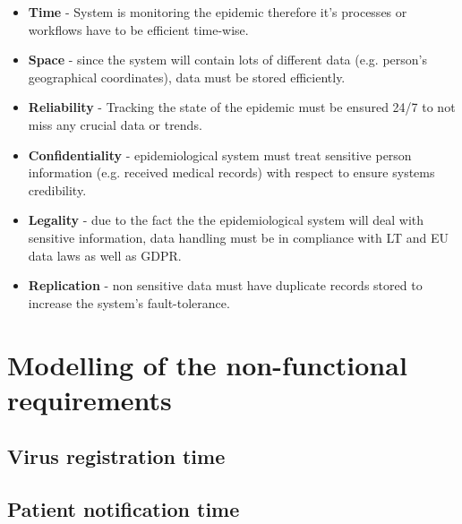 \documentclass{VUMIFPSkursinis}
\begin{document}
	\begin{itemize}
		\item{\textbf{Time} - System is monitoring the epidemic therefore it's processes or workflows have to be efficient time-wise.}
		\item{\textbf{Space} - since the system will contain lots of different data (e.g. person's geographical coordinates), data must be stored efficiently.}		
		\item{\textbf{Reliability} - Tracking the state of the epidemic must be ensured 24/7 to not miss any crucial data or trends.}
		\item{\textbf{Confidentiality} - epidemiological system must treat sensitive person information (e.g. received medical records) with respect to ensure systems credibility.}
		\item {\textbf{Legality} - due to the fact the the epidemiological system will deal with sensitive information, data handling must be in compliance with LT and EU data laws as well as GDPR.}
		\item{\textbf{Replication} - non sensitive data must have duplicate records stored to increase the system's fault-tolerance.}
	\end{itemize}

\section{Modelling of the non-functional requirements}
	\subsection{Virus registration time}
	\subsection{Patient notification time}
\end{document}
